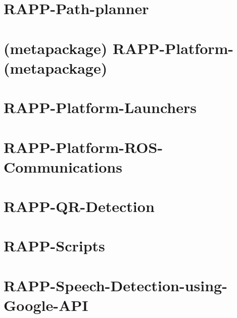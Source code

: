 \documentclass[twoside]{book}
\begin{document}
\chapter{R\-A\-P\-P-\/\-Path-\/planner}
\label{md_rapp-platform_8wiki_RAPP-Path-planner}
\hypertarget{md_rapp-platform_8wiki_RAPP-Path-planner}{}

\chapter{(metapackage) R\-A\-P\-P-\/\-Platform-\/(metapackage)}
\label{md_rapp-platform_8wiki_RAPP-Platform-}
\hypertarget{md_rapp-platform_8wiki_RAPP-Platform-}{}

\chapter{R\-A\-P\-P-\/\-Platform-\/\-Launchers}
\label{md_rapp-platform_8wiki_RAPP-Platform-Launchers}
\hypertarget{md_rapp-platform_8wiki_RAPP-Platform-Launchers}{}

\chapter{R\-A\-P\-P-\/\-Platform-\/\-R\-O\-S-\/\-Communications}
\label{md_rapp-platform_8wiki_RAPP-Platform-ROS-Communications}
\hypertarget{md_rapp-platform_8wiki_RAPP-Platform-ROS-Communications}{}

\chapter{R\-A\-P\-P-\/\-Q\-R-\/\-Detection}
\label{md_rapp-platform_8wiki_RAPP-QR-Detection}
\hypertarget{md_rapp-platform_8wiki_RAPP-QR-Detection}{}

\chapter{R\-A\-P\-P-\/\-Scripts}
\label{md_rapp-platform_8wiki_RAPP-Scripts}
\hypertarget{md_rapp-platform_8wiki_RAPP-Scripts}{}

\chapter{R\-A\-P\-P-\/\-Speech-\/\-Detection-\/using-\/\-Google-\/\-A\-P\-I}
\label{md_rapp-platform_8wiki_RAPP-Speech-Detection-using-Google-API}
\hypertarget{md_rapp-platform_8wiki_RAPP-Speech-Detection-using-Google-API}{}

\end{document}
